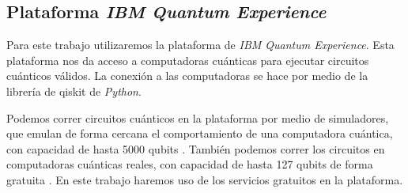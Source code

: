 \documentclass[letterpaper,12pt]{thesisECFM}
\theoremstyle{plain}
\theoremstyle{definition}
\theoremstyle{definition}
\theoremstyle{remark}
\newcommand{\1}{\mathbb{1}}
\begin{document}
\subsection{Plataforma \textit{IBM Quantum Experience}} %

Para este trabajo utilizaremos la plataforma de \textit{IBM Quantum
Experience}. Esta plataforma nos da acceso a computadoras cuánticas para
ejecutar circuitos cuánticos válidos. La conexión a las computadoras se hace
por medio de la librería de qiskit de \textit{Python}.  

Podemos correr circuitos cuánticos en la plataforma por medio de simuladores,
que emulan de forma cercana el comportamiento de una computadora cuántica, con
capacidad de hasta 5000 qubits  . También podemos correr los circuitos en
computadoras cuánticas reales,  con capacidad de hasta 127 qubits de forma
gratuita \cite{ibm_quantum_resources} . En este trabajo haremos uso de los servicios gratuitos en la
plataforma.  
\end{document}
